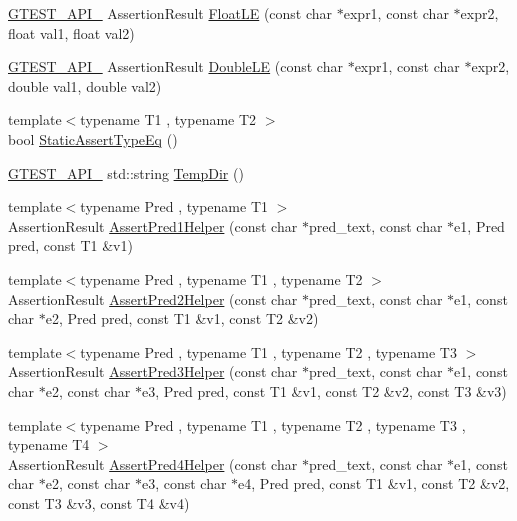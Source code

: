 \begin{DoxyCompactItemize}
\item 
\mbox{\hyperlink{gtest-port_8h_aa73be6f0ba4a7456180a94904ce17790}{G\+T\+E\+S\+T\+\_\+\+A\+P\+I\+\_\+}} Assertion\+Result \mbox{\hyperlink{namespacetesting_a2c9a2a391c72a7b02ea3024586e33af0}{Float\+LE}} (const char $\ast$expr1, const char $\ast$expr2, float val1, float val2)
\item 
\mbox{\hyperlink{gtest-port_8h_aa73be6f0ba4a7456180a94904ce17790}{G\+T\+E\+S\+T\+\_\+\+A\+P\+I\+\_\+}} Assertion\+Result \mbox{\hyperlink{namespacetesting_ae10e2bb304b74abd1b06a2d912a8b43b}{Double\+LE}} (const char $\ast$expr1, const char $\ast$expr2, double val1, double val2)
\item 
{\footnotesize template$<$typename T1 , typename T2 $>$ }\\bool \mbox{\hyperlink{namespacetesting_a661e70fc6afeb5c085eed3716aa45059}{Static\+Assert\+Type\+Eq}} ()
\item 
\mbox{\hyperlink{gtest-port_8h_aa73be6f0ba4a7456180a94904ce17790}{G\+T\+E\+S\+T\+\_\+\+A\+P\+I\+\_\+}} std\+::string \mbox{\hyperlink{namespacetesting_aae1bbe7c3cc99bf56263d51d3982a52e}{Temp\+Dir}} ()
\item 
{\footnotesize template$<$typename Pred , typename T1 $>$ }\\Assertion\+Result \mbox{\hyperlink{namespacetesting_a7f73180474723be6e92185d6fa9e7c9f}{Assert\+Pred1\+Helper}} (const char $\ast$pred\+\_\+text, const char $\ast$e1, Pred pred, const T1 \&v1)
\item 
{\footnotesize template$<$typename Pred , typename T1 , typename T2 $>$ }\\Assertion\+Result \mbox{\hyperlink{namespacetesting_aa6587938029dd8733ecb885068f08247}{Assert\+Pred2\+Helper}} (const char $\ast$pred\+\_\+text, const char $\ast$e1, const char $\ast$e2, Pred pred, const T1 \&v1, const T2 \&v2)
\item 
{\footnotesize template$<$typename Pred , typename T1 , typename T2 , typename T3 $>$ }\\Assertion\+Result \mbox{\hyperlink{namespacetesting_ac92dcbd00a0ffb2913e65d286e321a22}{Assert\+Pred3\+Helper}} (const char $\ast$pred\+\_\+text, const char $\ast$e1, const char $\ast$e2, const char $\ast$e3, Pred pred, const T1 \&v1, const T2 \&v2, const T3 \&v3)
\item 
{\footnotesize template$<$typename Pred , typename T1 , typename T2 , typename T3 , typename T4 $>$ }\\Assertion\+Result \mbox{\hyperlink{namespacetesting_ae90c778d69db4682e8fd8baaa0a9f9cd}{Assert\+Pred4\+Helper}} (const char $\ast$pred\+\_\+text, const char $\ast$e1, const char $\ast$e2, const char $\ast$e3, const char $\ast$e4, Pred pred, const T1 \&v1, const T2 \&v2, const T3 \&v3, const T4 \&v4)

\end{DoxyCompactItemize}
